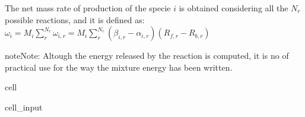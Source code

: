 \documentclass[letterpaper,10pt,english]{jupyterBook}
\begin{document}
\sphinxAtStartPar
The net mass rate of production of the specie \(i\) is obtained considering all the \(N_r\) possible reactions, and it is defined as: 
\(
\omega_i = M_i \sum_{r}^{N_r} \omega_{i,r} = M_i \sum_{r}^{N_r} \left(\beta_{i,r} - \alpha_{i,r} \right) \left( R_{f,r} - R_{b,r} \right)
\)

\begin{sphinxadmonition}{note}{Note:}
\sphinxAtStartPar
Altough the energy released by the reaction is computed, it is no of practical use for the way the mixture energy has been written.
\end{sphinxadmonition}

\begin{sphinxuseclass}{cell}\begin{sphinxVerbatimInput}

\begin{sphinxuseclass}{cell_input}
\begin{sphinxVerbatim}[commandchars=\\\{\}]
    
      
      
      
      \PYG{p}{[}\PYG{p}{]}
       
           
    

\end{sphinxVerbatim}
\end{sphinxuseclass}
\end{sphinxVerbatimInput}
\end{sphinxuseclass}
\end{document}
